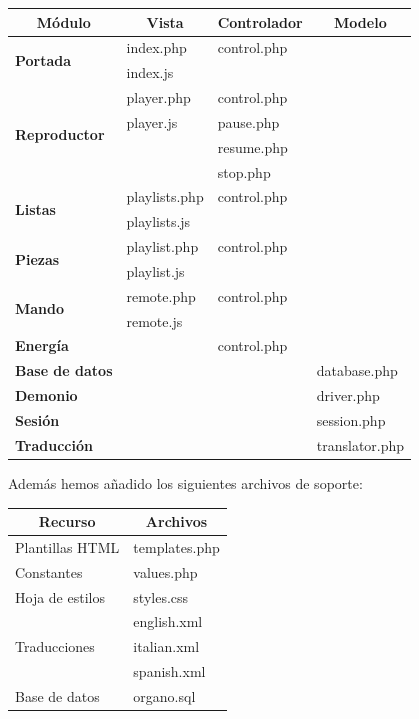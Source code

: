 \begin{center}
	\begin{tabular}{|l|l|l|l|}
		\hline \multicolumn{1}{|c|}{\textbf{Módulo}} & \multicolumn{1}{c|}{\textbf{Vista}} & \multicolumn{1}{c|}{\textbf{Controlador}} & \multicolumn{1}{c|}{\textbf{Modelo}} \\ 
		\hline \multirow{2}{*}{\textbf{Portada}} & index.php & control.php & \\
		& index.js & & \\
		\hline \multirow{4}{*}{\textbf{Reproductor}} & player.php & control.php & \\
		& player.js & pause.php & \\
		& & resume.php & \\
		& & stop.php & \\
		\hline \multirow{2}{*}{\textbf{Listas}} & playlists.php & control.php & \\
		& playlists.js & & \\
		\hline \multirow{2}{*}{\textbf{Piezas}} & playlist.php & control.php & \\
		& playlist.js & & \\
		\hline \multirow{2}{*}{\textbf{Mando}} & remote.php & control.php & \\
		& remote.js & & \\
		\hline \textbf{Energía} & & control.php & \\
		\hline \textbf{Base de datos} & & & database.php \\
		\hline \textbf{Demonio} & & & driver.php \\
		\hline \textbf{Sesión} & & & session.php \\
		\hline \textbf{Traducción} & & & translator.php \\
		\hline 
	\end{tabular}
	\smallskip
\end{center}

\smallskip

Además hemos añadido los siguientes archivos de soporte:

\smallskip

\begin{center}
	\begin{tabular}{|l|l|}
		\hline \multicolumn{1}{|c|}{\textbf{Recurso}} & \multicolumn{1}{c|}{\textbf{Archivos}}  \\ 
		\hline Plantillas HTML & templates.php \\
		\hline Constantes & values.php \\
		\hline Hoja de estilos & styles.css \\
		\hline \multirow{3}{*}{Traducciones} & english.xml \\
		& italian.xml \\
		& spanish.xml \\
		\hline Base de datos & organo.sql \\
		\hline 
	\end{tabular}
	\smallskip
\end{center}

